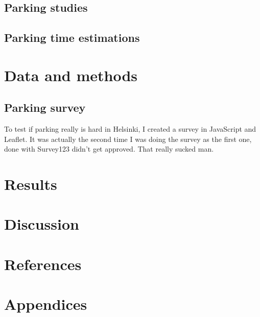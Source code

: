 \documentclass[a4paper,11pt]{article}
\begin{document}
\subsection{Parking studies}
\subsection{Parking time estimations}

\newpage
\section{Data and methods}
\subsection{Parking survey}
\justify
To test if parking really is hard in Helsinki, I created a survey in JavaScript and Leaflet. It was actually the second time I was doing the survey as the first one, done with Survey123 didn't get approved. That really sucked man.

\newpage
\section{Results}

\newpage
\section{Discussion}

\newpage
\section{References}
\renewcommand{\refname}{}


\newpage
\section{Appendices}
\end{document}
